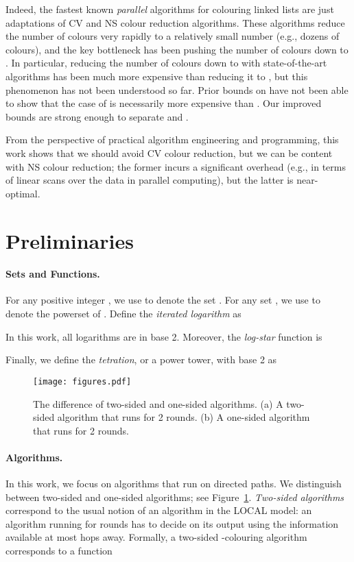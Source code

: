 \documentclass[a4paper,11pt]{article}
\theoremstyle{remark}
\begin{document}
Indeed, the fastest known \emph{parallel} algorithms for colouring linked lists are just adaptations of CV and NS colour reduction algorithms. These algorithms reduce the number of colours very rapidly to a relatively small number (e.g., dozens of colours), and the key bottleneck has been pushing the number of colours down to . In particular, reducing the number of colours down to  with state-of-the-art algorithms has been much more expensive than reducing it to , but this phenomenon has not been understood so far. Prior bounds on  have not been able to show that the case of  is necessarily more expensive than . Our improved bounds are strong enough to separate  and .

From the perspective of practical algorithm engineering and programming, this work shows that we should avoid CV colour reduction, but we can be content with NS colour reduction; the former incurs a significant overhead (e.g., in terms of linear scans over the data in parallel computing), but the latter is near-optimal.

\section{Preliminaries}

\paragraph{Sets and Functions.} For any positive integer , we use  to denote the set . For any set , we use  to denote the powerset of . Define the \emph{iterated logarithm} as

In this work, all logarithms are in base 2. 
Moreover, the \emph{log-star} function is

Finally, we define the \emph{tetration}, or a power tower, with base 2 as 


\begin{figure}[t]
    \centering
    \texttt{[image: figures.pdf]}
    \caption{The difference of two-sided and one-sided algorithms. (a) A two-sided algorithm  that runs for 2 rounds. (b) A one-sided algorithm  that runs for 2 rounds. \label{fig:algorithms}}
\end{figure}

\paragraph{Algorithms.}

In this work, we focus on algorithms that run on directed paths. We distinguish between two-sided and one-sided algorithms; see Figure~\ref{fig:algorithms}. \emph{Two-sided algorithms} correspond to the usual notion of an algorithm in the LOCAL model: an algorithm running for  rounds has to decide on its output using the information available at most  hops away. Formally, a two-sided -colouring algorithm corresponds to a function
\end{document}
